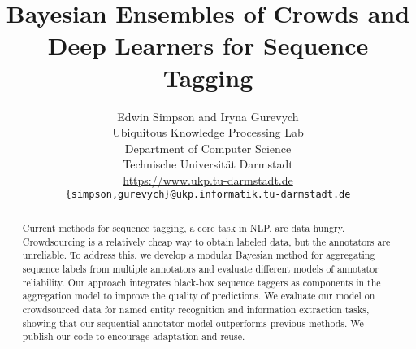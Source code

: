 \documentclass[11pt,a4paper]{article}
\title{Bayesian Ensembles of Crowds and Deep Learners for Sequence Tagging}%
\author{Edwin Simpson and Iryna Gurevych\\
  Ubiquitous Knowledge Processing Lab \\
  Department of Computer Science \\
  Technische Universit\"at Darmstadt \\
  \url{https://www.ukp.tu-darmstadt.de} \\
  {\tt \{simpson,gurevych\}@ukp.informatik.tu-darmstadt.de}
}
\begin{document}
\maketitle


\begin{abstract}
Current methods for sequence tagging, a core task in NLP, are data hungry.
Crowdsourcing is a relatively cheap way to obtain labeled data, but
the annotators are unreliable.
To address this, we develop
 a modular Bayesian method for aggregating sequence labels from multiple annotators
 and evaluate different models of annotator reliability.
Our approach integrates 
black-box sequence taggers as components in the aggregation model
to improve the quality of predictions.
We evaluate our model on crowdsourced data for named entity recognition and information extraction tasks,
showing that our sequential annotator model outperforms previous methods.
We publish our code to encourage adaptation and reuse.
\end{abstract}











%
% 


\end{document}

